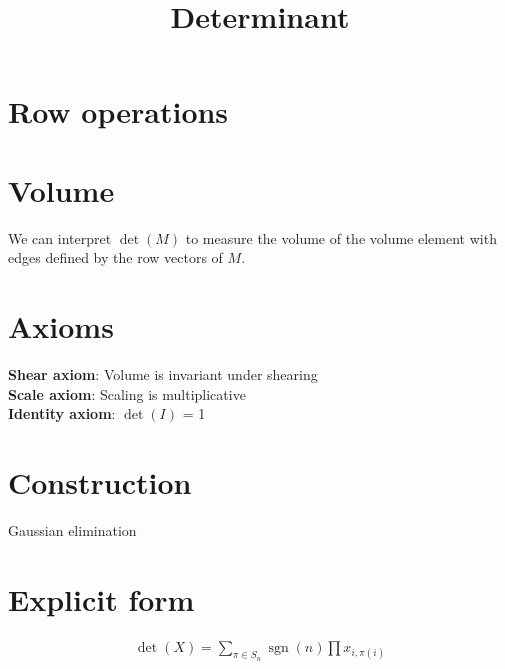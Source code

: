\documentclass{article}
\title{Determinant}
\date{}
\newcommand{\sgn}{\operatorname{sgn}}
\begin{document}
\maketitle

\section{Row operations}

\section{Volume}

We can interpret $\det(M)$ to measure the volume of the volume element with edges defined by the row vectors of $M$.

\section{Axioms}

\textbf{Shear axiom}: Volume is invariant under shearing \\
\textbf{Scale axiom}: Scaling is multiplicative \\
\textbf{Identity axiom}: $\det(I)$ = 1

\section{Construction}

Gaussian elimination

\section{Explicit form}

\begin{align}
\det(X) = \sum_{\pi \in S_n} \sgn(n) \prod x_{i,\pi(i)}
\end{align}
\end{document}
